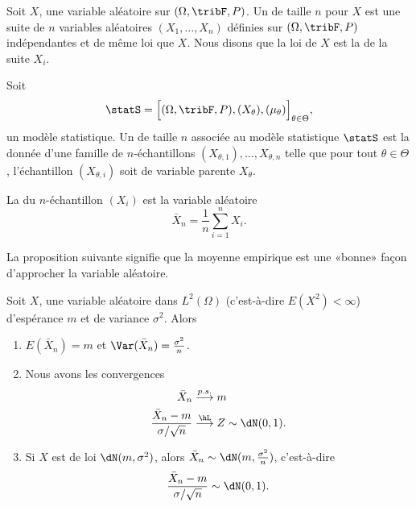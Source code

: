 Soit \( X\), une variable aléatoire sur \( (\Omega,\tribF,P)\). Un  de taille \( n\) pour \( X\) est une suite de \( n\) variables aléatoires \( (X_1,\ldots,X_n)\) définies sur \( (\Omega,\tribF,P)\) indépendantes et de même loi que \( X\). Nous disons que la loi de \( X\) est la  de la suite \( X_i\).

\begin{definition}
	Soit
	\begin{equation}
		\statS=\Big[ (\Omega,\tribF,P),(X_{\theta}),(\mu_{\theta}) \Big]_{\theta\in\Theta},
	\end{equation}
	un modèle statistique. Un  de taille \( n\) associée au modèle statistique \( \statS\) est la donnée d'une famille de \( n\)-échantillons \( (X_{\theta,1}),\ldots,X_{\theta,n}\) telle que pour tout \( \theta\in\Theta\), l'échantillon \( (X_{\theta,i})\) soit de variable parente \( X_{\theta}\).
\end{definition}

La  du \( n\)-échantillon \( (X_i)\) est la variable aléatoire
\begin{equation}
	\bar X_n=\frac{1}{ n }\sum_{i=1}^{n}X_i.
\end{equation}

La proposition suivante signifie que la moyenne empirique est une «bonne» façon d'approcher la variable aléatoire.
\begin{proposition}
	Soit \( X\), une variable aléatoire dans \( L^2(\Omega)\) (c'est-à-dire \( E(X^2)<\infty\)) d'espérance \( m\) et de variance \( \sigma^2\). Alors
	\begin{enumerate}
		\item
		      \( E(\bar X_n)=m\) et \( \Var(\bar X_n)=\frac{ \sigma^2 }{ n }\).
		\item
		      Nous avons les convergences
		      \begin{subequations}
			      \begin{align}
				      \bar X_n                               & \stackrel{p.s.}{\longrightarrow} m             \\
				      \frac{ \bar X_n-m }{ \sigma/\sqrt{n} } & \stackrel{\hL}{\longrightarrow} Z\sim\dN(0,1).
			      \end{align}
		      \end{subequations}
		\item
		      Si \( X\) est de loi \( \dN(m,\sigma^2)\), alors \( \bar X_n\sim\dN(m,\frac{ \sigma^2 }{ n })\), c'est-à-dire
		      \begin{equation}
			      \frac{ \bar X_n -m}{ \sigma/\sqrt{n} }\sim\dN(0,1).
		      \end{equation}


	\end{enumerate}

\end{proposition}

